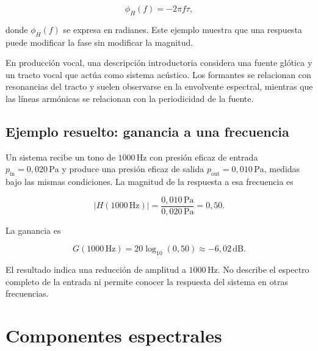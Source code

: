 \begin{equation}
    \phi_H(f)=-2\pi f\tau,
    \label{eq:u5-fase-retardo}
\end{equation}

donde \(\phi_H(f)\) se expresa en radianes. Este ejemplo muestra que una
respuesta puede modificar la fase sin modificar la magnitud.

En producción vocal, una descripción introductoria considera una fuente
glótica y un tracto vocal que actúa como sistema acústico. Los formantes se
relacionan con resonancias del tracto y suelen observarse en la envolvente
espectral, mientras que las líneas armónicas se relacionan con la periodicidad
de la fuente. 

\subsection{Ejemplo resuelto: ganancia a una frecuencia}
\label{sec:u5-ejemplo-respuesta}

Un sistema recibe un tono de \(1000\,\text{Hz}\) con presión eficaz de entrada
\(p_\mathrm{in}=0{,}020\,\text{Pa}\) y produce una presión eficaz de salida
\(p_\mathrm{out}=0{,}010\,\text{Pa}\), medidas bajo las mismas condiciones.
La magnitud de la respuesta a esa frecuencia es

\[
    \lvert H(1000\,\text{Hz})\rvert
    =\frac{0{,}010\,\text{Pa}}{0{,}020\,\text{Pa}}
    =0{,}50.
\]

La ganancia es

\[
    G(1000\,\text{Hz})
    =20\log_{10}(0{,}50)
    \approx-6{,}02\,\text{dB}.
\]

El resultado indica una reducción de amplitud a \(1000\,\text{Hz}\). No
describe el espectro completo de la entrada ni permite conocer la respuesta
del sistema en otras frecuencias.

\section{Componentes espectrales}
\label{sec:u5-componentes}

